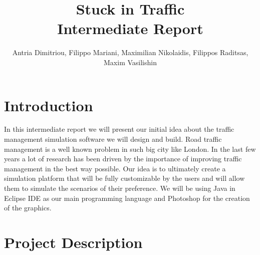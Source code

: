 \documentclass[oneside]{article}
\title{\vspace{-20mm}\fontsize{20pt}{10pt}\selectfont\textbf{Stuck in Traffic \\Intermediate Report}}
\author{
\large
{Antria Dimitriou, Filippo Mariani, Maximilian Nikolaidis, Filippos Raditsas, Maxim Vasilishin}\\[10mm] %
\vspace{-85mm}
}
\date{}
\begin{document}
\maketitle %








\section{Introduction}

In this intermediate report we will present our initial idea about the traffic management simulation software we will design and build. Road traffic management is a well known problem in such big city like London. In the last few years a lot of research has been driven by the importance of improving traffic management in the best way possible. Our idea is to ultimately create a simulation platform that will be fully customizable by the users and will allow them to simulate the scenarios of their preference. We will be using Java in Eclipse IDE as our main programming language and Photoshop for the creation of the graphics.

\section{Project Description}
\end{document}
